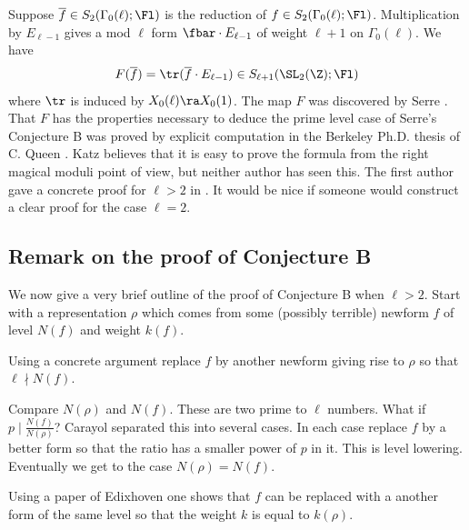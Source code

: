\documentclass{report}
\begin{document}
Suppose $\overline{f}\in S_2(\Gamma_0(\ell);\Fl)$ is the reduction
of $f\in{} S_2(\Gamma_0(\ell);\Fl)$.
Multiplication by $E_{\ell-1}$ gives a mod $\ell$
form $\fbar\cdot E_{\ell-1}$ of weight $\ell+1$ on $\Gamma_0(\ell)$.
We have
  $$F(\overline{f}) = \tr(\overline{f}\cdot E_{\ell-1})
        \in S_{\ell+1}(\SL_2(\Z);\Fl)$$
where $\tr$ is induced by $X_0(\ell)\ra X_0(1)$.
The map $F$ was discovered by Serre \cite{MR48:8389}.
That $F$ has the properties necessary to deduce the prime level
case of Serre's Conjecture B was proved by explicit computation
in the Berkeley Ph.D.  thesis of C. Queen \cite{queen}.
Katz believes that it is easy to prove the formula from the right
magical moduli point of view, but neither author has seen this.
The first author gave a concrete proof for $\ell>2$ in \cite{ribet:report}.
It would be nice if someone would construct a clear proof for the
case $\ell=2$.

\subsection{Remark on the proof of Conjecture B}
We now give a very brief outline of the
proof of Conjecture B when $\ell>2$.
Start with a representation $\rho$ which comes from
some (possibly terrible) newform $f$ of level $N(f)$ and weight $k(f)$. \\
\par{} Using a concrete argument replace
$f$ by another newform giving rise to $\rho$ so
that $\ell\nmid N(f)$.\\
\par{} Compare $N(\rho)$ and $N(f)$. These are two prime
to $\ell$ numbers. What if $p\mid \frac{N(f)}{N(\rho)}$? Carayol
separated this into several cases. In each case replace $f$
by a better form so that the ratio has a smaller power of
$p$ in it. This is level lowering.
Eventually we get to the case $N(\rho)=N(f)$. \\
\par{} Using a paper of Edixhoven \cite{edixhoven:weight}
one shows that $f$ can be replaced with a another form of the same
level so that the weight $k$ is equal to $k(\rho)$. \\
\end{document}
